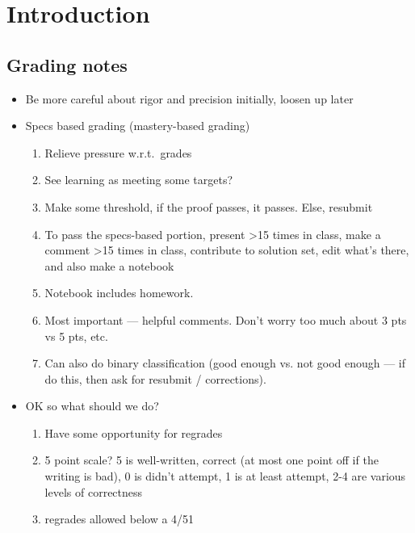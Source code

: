 \documentclass{fkbook}
\begin{document}
\pagestyle{plain}
\frontmatter


\maketitlepage
\tableofcontents
\mainmatter
\chapter{Introduction}
\pagestyle{main}
\section*{Grading notes}
\begin{itemize}
  \item Be more careful about rigor and precision initially, loosen up later
  \item Specs based grading (mastery-based grading)
    \begin{enumerate}
      \item Relieve pressure w.r.t.\ grades
      \item See learning as meeting some targets?
      \item Make some threshold, if the proof passes, it passes. Else, resubmit
      \item To pass the specs-based portion, present >15 times in class, make a
        comment >15 times in class, contribute to solution set, edit what's
        there, and also make a notebook
      \item Notebook includes homework.
      \item Most important --- helpful comments. Don't worry too much about 3
        pts vs 5 pts, etc.
      \item Can also do binary classification (good enough vs. not good enough
        --- if do this, then ask for resubmit / corrections).
    \end{enumerate}
  \item OK so what should we do?
    \begin{enumerate}
      \item Have some opportunity for regrades
      \item 5 point scale? 5 is well-written, correct (at most one point off if
        the writing is bad), 0 is didn't attempt, 1 is at least attempt, 2-4 are
        various levels of correctness
      \item regrades allowed below a 4/51
    \end{enumerate}
\end{itemize}
\end{document}
